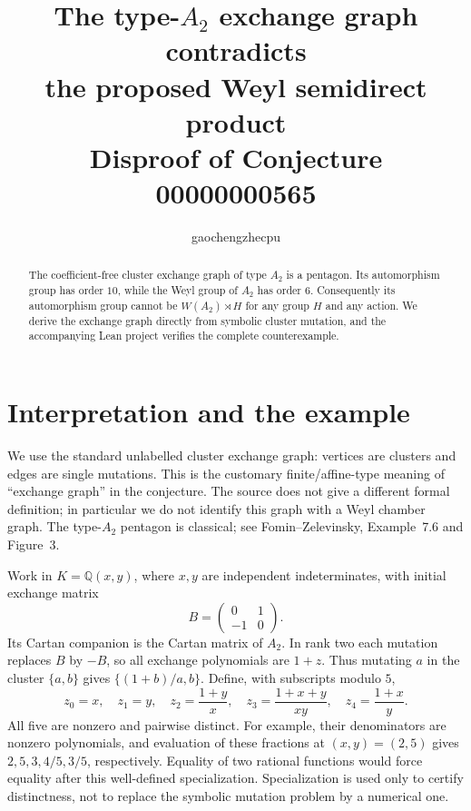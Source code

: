 \documentclass[11pt]{article}
\title{The type-$A_2$ exchange graph contradicts\\the proposed Weyl semidirect product\\
\large Disproof of Conjecture 00000000565}
\author{gaochengzhecpu}\date{}
\begin{document}
\maketitle
\begin{abstract}
The coefficient-free cluster exchange graph of type $A_2$ is a pentagon.
Its automorphism group has order $10$, while the Weyl group of $A_2$
has order $6$. Consequently its automorphism group cannot be
$W(A_2)\rtimes H$ for any group $H$ and any action. We derive the
exchange graph directly from symbolic cluster mutation, and the
accompanying Lean project verifies the complete counterexample.
\end{abstract}

\section*{Interpretation and the example}
We use the standard unlabelled cluster exchange graph: vertices are
clusters and edges are single mutations. This is the customary
finite/affine-type meaning of ``exchange graph'' in the conjecture.
The source does not give a different formal definition; in particular
we do not identify this graph with a Weyl chamber graph. The type-$A_2$
pentagon is classical; see Fomin--Zelevinsky, Example~7.6 and Figure~3.

Work in $K=\mathbb Q(x,y)$, where $x,y$ are independent indeterminates,
with initial exchange matrix
\[
 B=\begin{pmatrix}0&1\\-1&0\end{pmatrix}.
\]
Its Cartan companion is the Cartan matrix of $A_2$. In rank two each
mutation replaces $B$ by $-B$, so all exchange polynomials are $1+z$.
Thus mutating $a$ in the cluster $\{a,b\}$ gives
$\{(1+b)/a,b\}$. Define, with subscripts modulo $5$,
\[
 z_0=x,\quad z_1=y,\quad z_2=\frac{1+y}{x},\quad
 z_3=\frac{1+x+y}{xy},\quad z_4=\frac{1+x}{y}.
\]
All five are nonzero and pairwise distinct. For example, their
denominators are nonzero polynomials, and evaluation of these
fractions at $(x,y)=(2,5)$ gives
$2,5,3,4/5,3/5$, respectively. Equality of two rational functions
would force equality after this well-defined specialization.
Specialization is used only to certify distinctness, not to replace
the symbolic mutation problem by a numerical one.

\newpage
\end{document}
